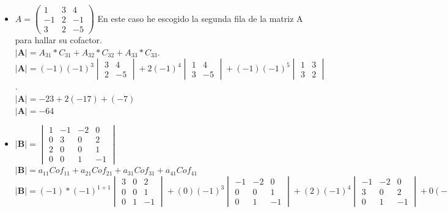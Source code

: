 \documentclass[stu, 12pt, letterpaper, donotrepeattitle, floatsintext, natbib]{apa7}
\begin{document}
\begin{itemize}
\item $
A= \begin{pmatrix}
1 & 3 & 4 \\ -1 & 2 & -1 \\ 3 & 2 & -5
\end{pmatrix}
$
\vspace{0.5cm}
En este caso he escogido la segunda fila de la matriz A para hallar su cofactor.\\
$\textbf{|A|} = A_{31}*C_{31} + A_{32}*C_{32} + A_{33}*C_{33}$.\\[0.5cm]
$\textbf{|A|} = 
(-1)(-1)^3 \begin{vmatrix} 3 & 4 \\ 2 & -5 \end{vmatrix}
+
2(-1)^4 \begin{vmatrix} 1 & 4 \\ 3 & -5 \end{vmatrix}
+
(-1)(-1)^5\begin{vmatrix} 1 & 3 \\ 3 & 2 \end{vmatrix}
$.\\[0.5cm]
$\textbf{|A|} = -23 + 2(-17) + (-7)$\\
$\textbf{|A|}=-64$\\[1cm]

\newpage

\item $
\textbf{|B|}= \begin{vmatrix}
1 & -1 & -2 & 0 \\
0 & 3 & 0 & 2 \\
2 & 0 & 0 & 1 \\
0 & 0 & 1 & -1
\end{vmatrix}
$\\[0.5cm]
$\textbf{|B|}=a_{11}{Cof}_{11} + a_{21}{Cof}_{21} + a_{31}{Cof}_{31} + a_{41}{Cof}_{41}$\\[0.5cm]

$\textbf{|B|}=(-1)*(-1)^{1+1} \begin{vmatrix} 3 & 0 & 2 \\ 0 & 0 & 1 \\ 0 & 1 & -1 \end{vmatrix}
+
(0)(-1)^3 \begin{vmatrix} -1 & -2 & 0 \\ 0 & 0 & 1 \\ 0 & 1 & -1 \end{vmatrix}
+
(2)(-1)^4 \begin{vmatrix} -1 & -2 & 0 \\ 3 & 0 & 2 \\ 0 & 1 & -1 \end{vmatrix}
+
0(-1)^5 \begin{vmatrix} -1 & -2 & 0 \\ 3 & 0 & 2 \\ 0 & 0 & 1 \end{vmatrix}
$\\[0.5cm]


\end{itemize}
\end{document}
